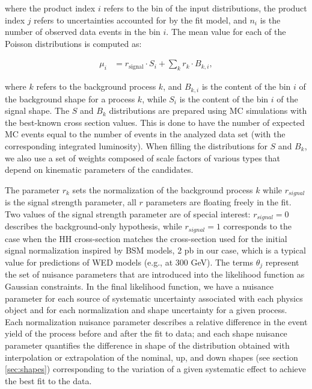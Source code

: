 \begin{small}
\noindent where the product index $i$ refers to the bin of the input distributions, the product index $j$
refers to uncertainties accounted for by the fit model, and $n_i$ is the number of observed data
events in the bin $i$. The mean value for each of the Poisson distributions is computed as:

\begin{align*}
\mu_{i} &= r_{\text{signal}} \cdot S_{i} + \sum_{k}r_{k}\cdot B_{k,i},
\end{align*}

\noindent where $k$ refers to the background process $k$, and $B_{k,i}$ is the content of the bin $i$ of the background
shape for a process $k$, while $S_i$ is the content of the bin $i$ of the signal shape. The $S$ and $B_k$ distributions are prepared using MC simulations with the best-known cross section values. This is done to have the number of expected MC events equal to the number of events in the analyzed data set (with the corresponding integrated luminosity). When filling the distributions for $S$ and $B_k$, we also use a set of weights composed of scale factors of various types that depend on kinematic parameters of the candidates.

The parameter $r_k$ sets the normalization of the background process $k$ while $r_{signal}$ is the signal strength parameter, all $r$ parameters are floating freely in the fit. Two values of the signal strength parameter are of special interest: $r_{signal} = 0$ describes the background-only hypothesis, while $r_{signal} = 1$ corresponds to the case when the HH cross-section matches the cross-section used for the initial signal normalization inspired by BSM models, 2 pb in our case, which is a typical value for predictions of WED models (e.g., at 300 GeV). The terms $\theta_j$ represent the set of nuisance parameters that are introduced into the likelihood function as Gaussian constraints. In the final likelihood function, we have a nuisance parameter for each source of systematic uncertainty associated with each physics object and for each normalization and shape uncertainty for a given process. Each normalization nuisance parameter describes a relative difference in the event yield of the process before and after the fit to data; and each shape nuisance parameter quantifies the difference in shape of the \mTHH distribution obtained with interpolation or extrapolation of the nominal, up, and down shapes (see section \ref{sec:shapes}) corresponding to the variation of a given systematic effect to achieve the best fit to the data.


\end{small}
